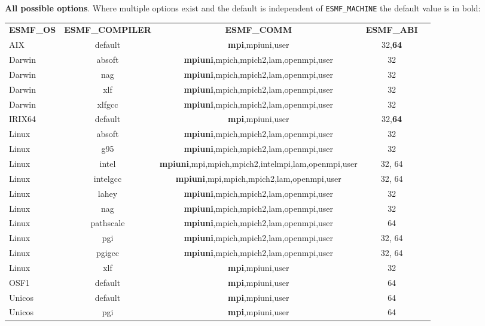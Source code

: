 \vspace{1ex}

{\bf All possible options}. Where multiple options exist 
and the default is independent of {\tt ESMF\_MACHINE} the default value is in bold:

\vspace{1ex}


\begin{tabular}{lcccc}
  {\bfseries ESMF\_OS} &{\bfseries ESMF\_COMPILER} & {\bfseries ESMF\_COMM} & {\bfseries ESMF\_ABI} \\

AIX     &  default      &  {\bf mpi},mpiuni,user         &  32,{\bf 64}  \\
Darwin  &  absoft       &  {\bf mpiuni},mpich,mpich2,lam,openmpi,user  &  32  \\
Darwin  &  nag          &  {\bf mpiuni},mpich,mpich2,lam,openmpi,user  &  32  \\
Darwin  &  xlf          &  {\bf mpiuni},mpich,mpich2,lam,openmpi,user  &  32  \\
Darwin  &  xlfgcc       &  {\bf mpiuni},mpich,mpich2,lam,openmpi,user  &  32  \\
IRIX64  &  default      &  {\bf mpi},mpiuni,user         &  32,{\bf 64}  \\
Linux   &  absoft       &  {\bf mpiuni},mpich,mpich2,lam,openmpi,user  &  32  \\
Linux   &  g95          &  {\bf mpiuni},mpich,mpich2,lam,openmpi,user  &  32  \\
Linux   &  intel        &  {\bf mpiuni},mpi,mpich,mpich2,intelmpi,lam,openmpi,user  &  32, 64 \\
Linux   &  intelgcc     &  {\bf mpiuni},mpi,mpich,mpich2,lam,openmpi,user  &  32, 64 \\
Linux   &  lahey        &  {\bf mpiuni},mpich,mpich2,lam,openmpi,user  &  32  \\
Linux   &  nag          &  {\bf mpiuni},mpich,mpich2,lam,openmpi,user  &  32  \\
Linux   &  pathscale    &  {\bf mpiuni},mpich,mpich2,lam,openmpi,user  &  64  \\
Linux   &  pgi          &  {\bf mpiuni},mpich,mpich2,lam,openmpi,user  &  32, 64  \\
Linux   &  pgigcc       &  {\bf mpiuni},mpich,mpich2,lam,openmpi,user  &  32, 64  \\
Linux   &  xlf          &  {\bf mpi},mpiuni,user         &  32  \\
OSF1    &  default      &  {\bf mpi},mpiuni,user         &  64  \\
Unicos  &  default      &  {\bf mpi},mpiuni,user         &  64  \\
Unicos  &  pgi          &  {\bf mpi},mpiuni,user         &  64

\end{tabular}

\vspace{1ex}


